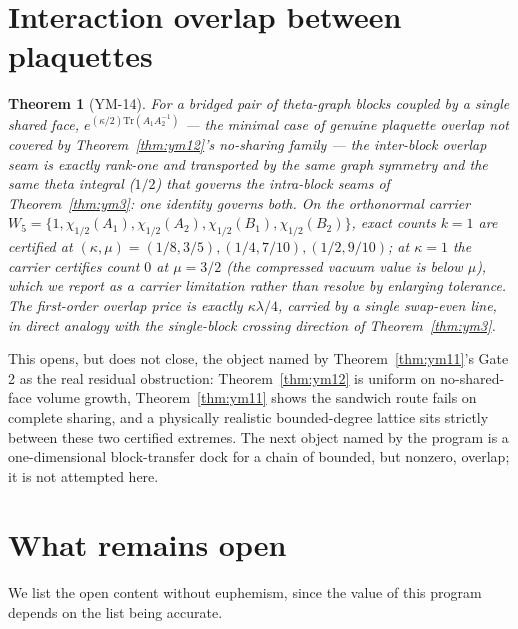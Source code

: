 \documentclass[aps,prd,twocolumn,superscriptaddress,nofootinbib]{revtex4-2}
\newcommand{\Tr}{\mathrm{Tr}}
\newtheorem{theorem}{Theorem}
\begin{document}
\section{Interaction overlap between plaquettes}\label{sec:overlap}

\begin{theorem}[YM-14]\label{thm:ym14}
For a bridged pair of theta-graph blocks coupled by a single shared
face, $e^{(\kappa/2)\Tr(A_1A_2^{-1})}$ --- the minimal case of genuine
plaquette overlap not covered by Theorem~\ref{thm:ym12}'s no-sharing
family --- the inter-block overlap seam is exactly rank-one and
transported by the same graph symmetry and the same theta integral
($1/2$) that governs the intra-block seams of Theorem~\ref{thm:ym3}: one
identity governs both. On the orthonormal carrier
$W_5=\{1,\chi_{1/2}(A_1),\chi_{1/2}(A_2),\chi_{1/2}(B_1),\chi_{1/2}(B_2)\}$,
exact counts $k=1$ are certified at
$(\kappa,\mu)=(1/8,3/5),(1/4,7/10),(1/2,9/10)$; at $\kappa=1$ the carrier
certifies count $0$ at $\mu=3/2$ (the compressed vacuum value is below
$\mu$), which we report as a carrier limitation rather than resolve by
enlarging tolerance. The first-order overlap price is exactly
$\kappa\lambda/4$, carried by a single swap-even line, in direct analogy
with the single-block crossing direction of Theorem~\ref{thm:ym3}.
\end{theorem}

This opens, but does not close, the object named by
Theorem~\ref{thm:ym11}'s Gate 2 as the real residual obstruction:
Theorem~\ref{thm:ym12} is uniform on no-shared-face volume growth,
Theorem~\ref{thm:ym11} shows the sandwich route fails on complete
sharing, and a physically realistic bounded-degree lattice sits strictly
between these two certified extremes. The next object named by the
program is a one-dimensional block-transfer dock for a chain of
bounded, but nonzero, overlap; it is not attempted here.

\section{What remains open}\label{sec:open}

We list the open content without euphemism, since the value of this
program depends on the list being accurate.
\end{document}

